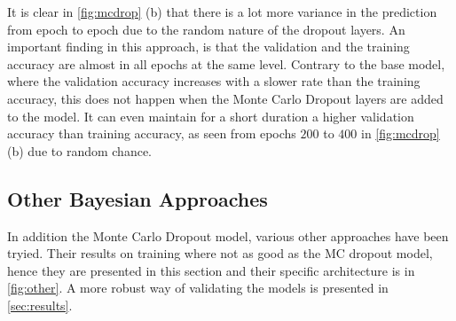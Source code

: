 \documentclass[11pt,twoside]{article}
\numberwithin{Theorem}{section}
\numberwithin{Definition}{section}
\numberwithin{Lemma}{section}
\numberwithin{Algorithm}{section}
\numberwithin{equation}{section}
\begin{document}
It is clear in \autoref{fig:mcdrop} (b) that there is a lot more variance in the prediction from epoch to epoch due to the random nature of the dropout layers. An important finding in this approach, is that the validation and the training accuracy are almost in all epochs at the same level. Contrary to the base model, where the validation accuracy increases with a slower rate than the training accuracy, this does not happen when the Monte Carlo Dropout layers are added to the model. It can even maintain for a short duration a higher validation accuracy than training accuracy, as seen from epochs $200$ to $400$ in \autoref{fig:mcdrop} (b) due to random chance.

\subsection{Other Bayesian Approaches}
\label{sec:other}

In addition the Monte Carlo Dropout model, various other approaches have been tryied. Their results on training where not as good as the MC dropout model, hence they are presented in this section and their specific architecture is in \autoref{fig:other}. A more robust way of validating the models is presented in \autoref{sec:results}.
\end{document}

